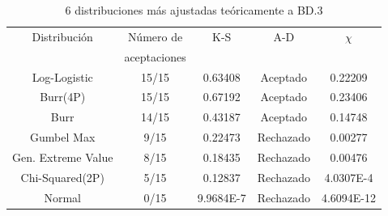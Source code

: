 \documentclass[12pt]{report}
\begin{document}
\begin{table}[h!]
	\centering
	\begin{tabular}{|c|c|c|c|c|}			
		\hline
		Distribución	  &Número de	&K-S	&A-D	& $\chi$  \\
		&	aceptaciones &     &	 &     \\ \hline
		Log-Logistic    &    15/15    & 0.63408   & 	Aceptado     &0.22209    \\ \hline
		Burr(4P) &    15/15	& 0.67192    &  Aceptado   	& 0.23406   \\ \hline
		Burr &    14/15	& 0.43187	&  Aceptado 	&   0.14748	\\ \hline 
		Gumbel Max  &    9/15	& 0.22473  &   Rechazado	& 0.00277   	\\ \hline
		Gen. Extreme Value  &   8/15	&     0.18435   &      	Rechazado   &  0.00476	\\ \hline
		Chi-Squared(2P)   &   5/15	& 0.12837    &   	Rechazado	& 4.0307E-4   	\\ \hline
		Normal   &   0/15	& 9.9684E-7    &   	Rechazado	& 4.6094E-12	\\ \hline %
	\end{tabular}
	\caption{6 distribuciones más ajustadas teóricamente a BD.3}
	\label{teo_BD3}
\end{table}
\end{document}
